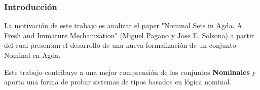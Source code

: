 \begin{frame}
    \frametitle{Introducción}
    La motivación de este trabajo es analizar el paper 
    "Nominal Sets in Agda. A Fresh and Immature Mechanization" (Miguel Pagano y Jose E. Solsona)
    a partir del cual presentan el desarrollo de una nueva formalización 
    de un conjunto Nominal en Agda.
    
    Este trabajo contribuye a una mejor comprensión de los conjuntos \textbf{Nominales} y 
    aporta una forma de
    probar sistemas de tipos basados en lógica nominal.
\end{frame}